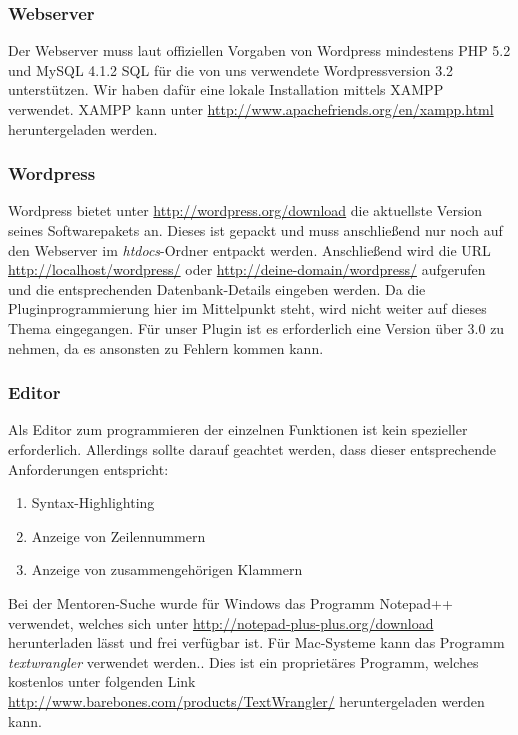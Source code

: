 \subsubsection{Webserver}
Der Webserver muss laut offiziellen Vorgaben von Wordpress mindestens \gls{PHP} 5.2 und MySQL 4.1.2 \gls{SQL} für die von uns verwendete Wordpressversion 3.2 unterstützen. \newline
Wir haben dafür eine lokale Installation mittels \gls{XAMPP} verwendet. \gls{XAMPP} kann unter \url{http://www.apachefriends.org/en/xampp.html} heruntergeladen werden.
\subsubsection{Wordpress}
Wordpress bietet unter \url{http://wordpress.org/download} die aktuellste Version seines Softwarepakets an. Dieses ist gepackt und muss anschließend nur noch auf den Webserver im \emph{htdocs}-Ordner entpackt werden. Anschließend wird  die \gls{URL} \url{http://localhost/wordpress/} oder \url{http://deine-domain/wordpress/} aufgerufen und die entsprechenden Datenbank-Details eingeben werden. \newline
Da die Pluginprogrammierung hier im Mittelpunkt steht, wird nicht weiter auf dieses Thema eingegangen. Für unser Plugin ist es erforderlich  eine Version über 3.0 zu nehmen, da es ansonsten zu Fehlern kommen kann.
\subsubsection{Editor}
Als Editor zum programmieren der einzelnen Funktionen ist kein spezieller erforderlich. Allerdings sollte darauf geachtet werden, dass dieser entsprechende Anforderungen entspricht:
\begin{enumerate}
	\item Syntax-Highlighting
	\item Anzeige von Zeilennummern
	\item Anzeige von zusammengehörigen Klammern
\end{enumerate}
Bei der Mentoren-Suche wurde für Windows das Programm Notepad++ verwendet, welches sich unter \url{http://notepad-plus-plus.org/download} herunterladen lässt und frei verfügbar ist. \newline
Für Mac-Systeme kann das Programm \emph{textwrangler} verwendet werden.. Dies ist ein proprietäres Programm, welches kostenlos unter folgenden Link \url{http://www.barebones.com/products/TextWrangler/} heruntergeladen werden kann.
